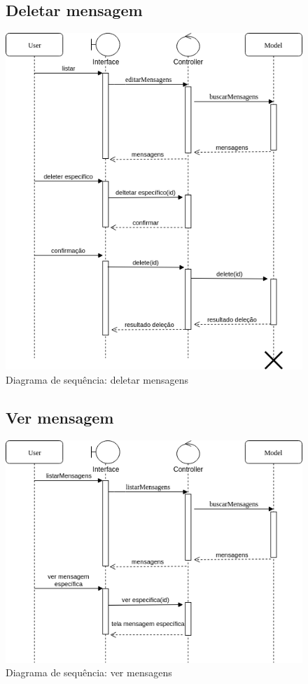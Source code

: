 \documentclass[
	12pt,				%
	openright,			%
	twoside,			%
	a4paper,			%
	english,			%
	french,				%
	spanish,			%
	brazil				%
]{abntex2}
\begin{document}
\begin{figure}
	\subsection{Deletar mensagem}
	\label{figure_diagrama_sequencia_deletar_mensagem}
	\caption{Diagrama de sequência: deletar mensagens}
	\includegraphics[scale=0.6]{SequenceMensagens/DeleteMessageSequence.png}
	\hfill
\end{figure}
%
\begin{figure}[h]
	\subsection{Ver mensagem}
	\label{figure_diagrama_sequencia_ver_mensagem}
	\caption{Diagrama de sequência: ver mensagens}
	\includegraphics[scale=0.6]{SequenceMensagens/VerMensagensSequence.png}
	\hfill
\end{figure}
\end{document}
